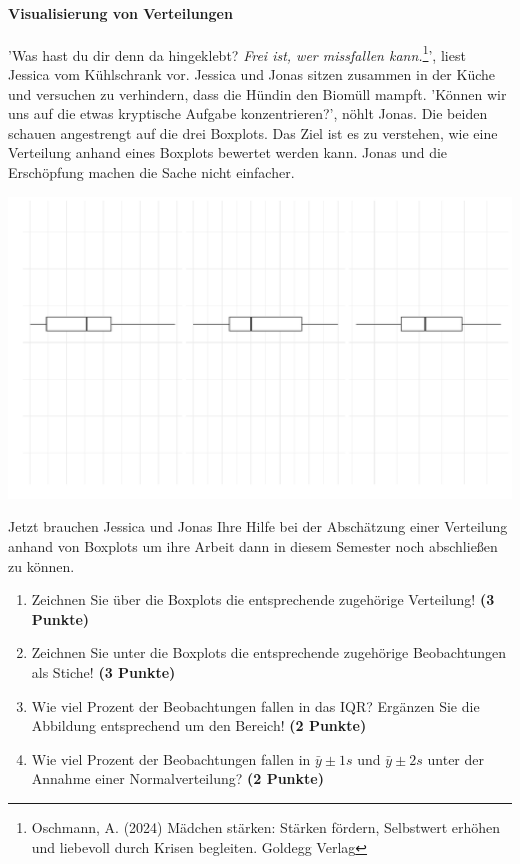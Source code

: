 \documentclass[a4paper, 9pt]{scrartcl}\usepackage[]{graphicx}\usepackage[]{xcolor}
\makeatletter
\def\maxwidth{ %
  \ifdim\Gin@nat@width>\linewidth
    \linewidth
  \else
    \Gin@nat@width
  \fi
}
\makeatother
\begin{document}
\ifcollection
\paragraph{Visualisierung von Verteilungen}
\fi

'Was hast du dir denn da hingeklebt? \textit{Frei ist, wer missfallen kann.}\footnote{Oschmann, A. (2024) Mädchen stärken: Stärken fördern, Selbstwert erhöhen und liebevoll durch Krisen begleiten. Goldegg Verlag}', liest Jessica vom Kühlschrank vor. Jessica und Jonas sitzen zusammen in der Küche und versuchen zu verhindern, dass die Hündin den Biomüll mampft. 'Können wir uns auf die etwas kryptische Aufgabe konzentrieren?', nöhlt Jonas. Die beiden schauen angestrengt auf die drei Boxplots. Das Ziel ist es zu verstehen, wie eine Verteilung anhand eines Boxplots bewertet werden kann. Jonas und die Erschöpfung machen die Sache nicht einfacher.



{\centering \includegraphics[width=\maxwidth]{img/desc-stat-11-1} 

}




Jetzt brauchen Jessica und Jonas Ihre Hilfe bei der Abschätzung einer Verteilung anhand von Boxplots um ihre Arbeit dann in diesem Semester noch abschließen zu können.

\begin{enumerate}
\item Zeichnen Sie über die Boxplots die entsprechende zugehörige Verteilung! \textbf{(3 Punkte)} 
\item Zeichnen Sie unter die Boxplots die entsprechende zugehörige Beobachtungen als Stiche! \textbf{(3 Punkte)}
\item Wie viel Prozent der Beobachtungen fallen in das IQR? Ergänzen Sie die Abbildung entsprechend um den Bereich! \textbf{(2 Punkte)}
\item Wie viel Prozent der Beobachtungen fallen in $\bar{y} \pm 1s$ und $\bar{y} \pm 2s$  unter der Annahme einer Normalverteilung? \textbf{(2 Punkte)}
\end{enumerate} 
\clearpage
\end{document}
